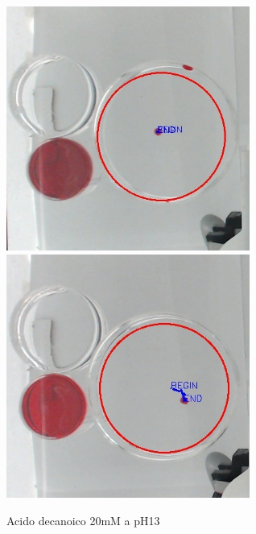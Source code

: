 \begin{figure}[h]
	\centering
   		{\includegraphics[width=8cm]{immagini/20mMpH13-1.jpg}}
 	\hspace{2mm}   	
		{\includegraphics[width=8cm]{immagini/20mMpH13-2.jpg}}
	\caption{Acido decanoico 20mM a pH13}
\end{figure}

